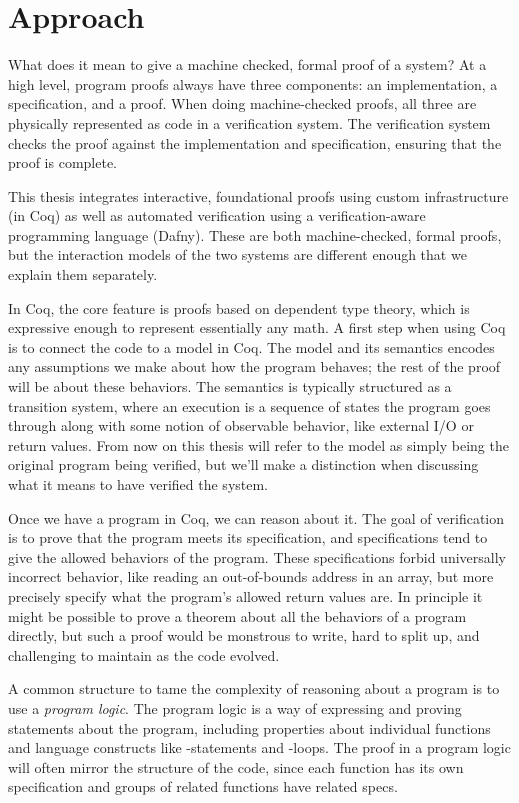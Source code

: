 \section{Approach}

What does it mean to give a machine checked, formal proof of a system? At a high
level, program proofs always have three components: an implementation, a
specification, and a proof. When doing machine-checked proofs, all three are
physically represented as code in a verification system. The verification system
checks the proof against the implementation and specification, ensuring that the
proof is complete.

This thesis integrates interactive, foundational proofs using custom
infrastructure (in Coq) as well as automated verification using a
verification-aware programming language (Dafny). These are both machine-checked,
formal proofs, but the interaction models of the two systems are different
enough that we explain them separately.

In Coq, the core feature is proofs based on dependent type theory, which is
expressive enough to represent essentially any math. A first step when using Coq
is to connect the code to a model in Coq. The model and its semantics encodes any
assumptions we make about how the program behaves; the rest of the proof will be
about these behaviors. The semantics is typically structured as a transition
system, where an execution is a sequence of states the program goes through
along with some notion of observable behavior, like external I/O or return
values. From now on this thesis will refer to the model as simply being the original
program being verified,
but we'll make a distinction when discussing what it means to have verified
the system.

Once we have a program in Coq, we can reason about it. The goal of
verification is to prove that the program meets its specification, and
specifications tend to give the allowed behaviors of the program. These
specifications forbid universally incorrect behavior, like reading an
out-of-bounds address in an array, but more precisely specify what the program's
allowed return values are. In principle it might be possible to prove a theorem
about all the behaviors of a program directly, but such a proof would be
monstrous to write, hard to split up, and challenging to maintain as the code
evolved.

A common structure to tame the complexity of reasoning about a program is to use
a \emph{program logic}. The program logic is a way of expressing and proving
statements about the program, including properties about individual functions
and language constructs like -statements and -loops. The proof
in a program logic will often mirror the structure of the code, since each
function has its own specification and groups of related functions have related
specs.

